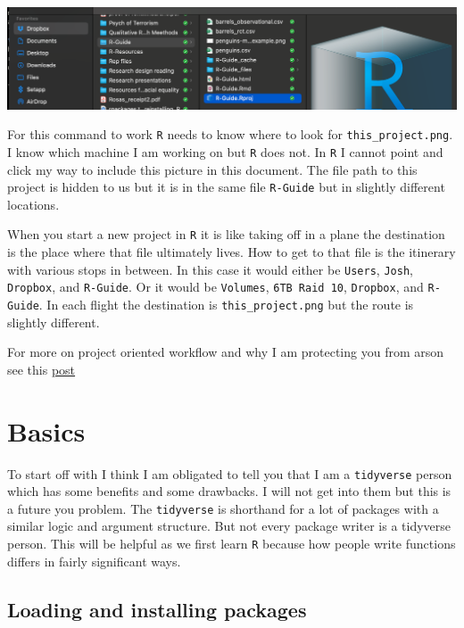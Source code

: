 \documentclass[]{tufte-handout}
\begin{document}
\begin{center}\includegraphics[width=28.69in]{this_project} \end{center}

For this command to work \texttt{R} needs to know where to look for
\texttt{this\_project.png}. I know which machine I am working on but
\texttt{R} does not. In \texttt{R} I cannot point and click my way to
include this picture in this document. The file path to this project is
hidden to us but it is in the same file \texttt{R-Guide} but in slightly
different locations.

When you start a new project in \texttt{R} it is like taking off in a
plane the destination is the place where that file ultimately lives. How
to get to that file is the itinerary with various stops in between. In
this case it would either be \texttt{Users}, \texttt{Josh},
\texttt{Dropbox}, and \texttt{R-Guide}. Or it would be \texttt{Volumes},
\texttt{6TB\ Raid\ 10}, \texttt{Dropbox}, and \texttt{R-Guide}. In each
flight the destination is \texttt{this\_project.png} but the route is
slightly different.

For more on project oriented workflow and why I am protecting you from
arson see this
\href{https://www.tidyverse.org/blog/2017/12/workflow-vs-script/}{post}

\hypertarget{basics}{%
\section{Basics}\label{basics}}

To start off with I think I am obligated to tell you that I am a
\texttt{tidyverse} person which has some benefits and some drawbacks. I
will not get into them but this is a future you problem. The
\texttt{tidyverse} is shorthand for a lot of packages with a similar
logic and argument structure. But not every package writer is a
tidyverse person. This will be helpful as we first learn \texttt{R}
because how people write functions differs in fairly significant ways.

\hypertarget{loading-and-installing-packages}{%
\subsection{Loading and installing
packages}\label{loading-and-installing-packages}}
\end{document}

